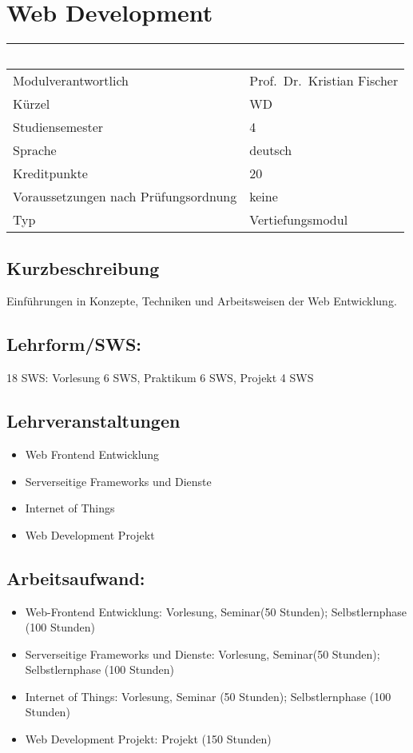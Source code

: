 \chapter{Web Development}\label{web-development}

\begin{longtable}[]{@{}ll@{}}
\toprule
~ & ~\tabularnewline
\midrule
\endhead
Modulverantwortlich & Prof.~Dr.~Kristian Fischer\tabularnewline
Kürzel & WD\tabularnewline
Studiensemester & 4\tabularnewline
Sprache & deutsch\tabularnewline
Kreditpunkte & 20\tabularnewline
Voraussetzungen nach Prüfungsordnung & keine\tabularnewline
Typ & Vertiefungsmodul\tabularnewline
\bottomrule
\end{longtable}

\section*{Kurzbeschreibung}\label{kurzbeschreibung-5}

Einführungen in Konzepte, Techniken und Arbeitsweisen der Web
Entwicklung.

\section*{Lehrform/SWS:}\label{lehrformsws-26}

18 SWS: Vorlesung 6 SWS, Praktikum 6 SWS, Projekt 4 SWS

\section*{Lehrveranstaltungen}\label{lehrveranstaltungen-1}

\begin{itemize}
\item
  Web Frontend Entwicklung
\item
  Serverseitige Frameworks und Dienste
\item
  Internet of Things
\item
  Web Development Projekt
\end{itemize}

\section*{Arbeitsaufwand:}\label{arbeitsaufwand-25}

\begin{itemize}
\item
  Web-Frontend Entwicklung: Vorlesung, Seminar(50 Stunden);
  Selbstlernphase (100 Stunden)
\item
  Serverseitige Frameworks und Dienste: Vorlesung, Seminar(50 Stunden);
  Selbstlernphase (100 Stunden)
\item
  Internet of Things: Vorlesung, Seminar (50 Stunden); Selbstlernphase
  (100 Stunden)
\item
  Web Development Projekt: Projekt (150 Stunden)
\end{itemize}


